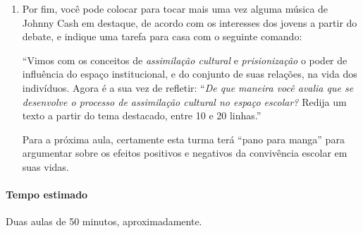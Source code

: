 \documentclass[11pt]{extarticle}
\begin{document}
\begin{enumerate}
\begin{itemize}
\item `Qual o impacto de rotular e
estereotipar pessoas sem sequer conhecê"-las em profundidade para a vida
coletiva e individual?

\item`O que vocês compreenderam por
`prisionização'? Seria a mesma coisa que o conceito de `assimilação
cultural', segundo o autor?''

\item ``A prisionização acontece invariavelmente ou
os sujeitos podem apresentar alguma margem de resistência sobre este
fenômeno?''

\item ``Você caracterizaria o fenômeno de prisionização enquanto
fenômeno violento? Por que?''
\end{itemize}

Durante o debate, procure retomar elementos das músicas de Johnny Cash
que tratam sobre a prisionização e de que maneira podemos identificá"-la
nas experiências individuais. Registre as respostas mais interessantes
no quadro ou em folha de cartolina para a turma.

\item Por fim, você pode colocar para tocar mais uma vez alguma música de
Johnny Cash em destaque, de acordo com os interesses dos jovens a partir
do debate, e indique uma tarefa para casa com o seguinte comando:

``Vimos com os conceitos de \emph{assimilação cultural} e \emph{prisionização} o
poder de influência do espaço institucional, e do conjunto de suas
relações, na vida dos indivíduos. Agora é a sua vez de refletir: ``\emph{De que
maneira você avalia que se desenvolve o processo de assimilação cultural
no espaço escolar?} Redija um texto a partir do tema destacado, entre 10
e 20 linhas.''

Para a próxima aula, certamente esta turma terá ``pano para manga'' para
argumentar sobre os efeitos positivos e negativos da convivência escolar
em suas vidas.
\end{enumerate}

\paragraph{Tempo estimado} Duas aulas de 50 minutos, aproximadamente.

\end{document}
